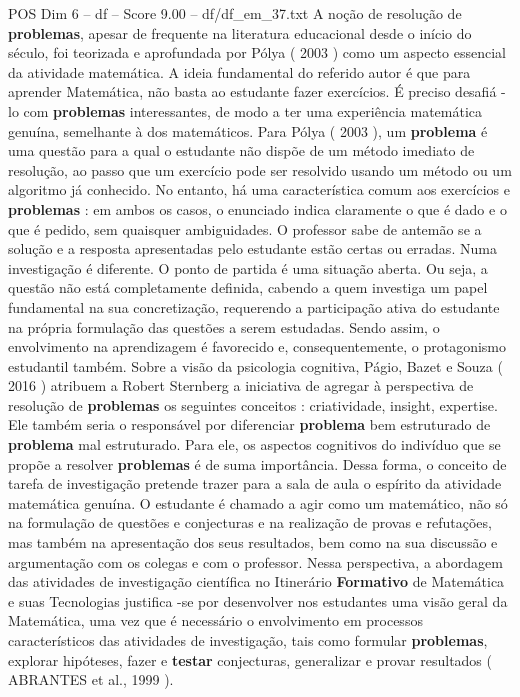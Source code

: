 \begin{textsample}{POS Dim 6 – df – Score 9.00 – df/df\_em\_37.txt}
A noção de resolução de \textbf{problemas}, apesar de frequente na literatura educacional desde o início do século, foi teorizada e aprofundada por Pólya ( 2003 ) como um aspecto essencial da atividade matemática.
A ideia fundamental do referido autor é que para aprender Matemática, não basta ao estudante fazer exercícios.
É preciso desafiá -lo com \textbf{problemas} interessantes, de modo a ter uma experiência matemática genuína, semelhante à dos matemáticos.
Para Pólya ( 2003 ), um \textbf{problema} é uma questão para a qual o estudante não dispõe de um método imediato de resolução, ao passo que um exercício pode ser resolvido usando um método ou um algoritmo já conhecido.
No entanto, há uma característica comum aos exercícios e \textbf{problemas} : em ambos os casos, o enunciado indica claramente o que é dado e o que é pedido, sem quaisquer ambiguidades.
O professor sabe de antemão se a solução e a resposta apresentadas pelo estudante estão certas ou erradas.
Numa investigação é diferente.
O ponto de partida é uma situação aberta.
Ou seja, a questão não está completamente definida, cabendo a quem investiga um papel fundamental na sua concretização, requerendo a participação ativa do estudante na própria formulação das questões a serem estudadas.
Sendo assim, o envolvimento na aprendizagem é favorecido e, consequentemente, o protagonismo estudantil também.
Sobre a visão da psicologia cognitiva, Págio, Bazet e Souza ( 2016 ) atribuem a Robert Sternberg a iniciativa de agregar à perspectiva de resolução de \textbf{problemas} os seguintes conceitos : criatividade, insight, expertise.
Ele também seria o responsável por diferenciar \textbf{problema} bem estruturado de \textbf{problema} mal estruturado.
Para ele, os aspectos cognitivos do indivíduo que se propõe a resolver \textbf{problemas} é de suma importância.
Dessa forma, o conceito de tarefa de investigação pretende trazer para a sala de aula o espírito da atividade matemática genuína.
O estudante é chamado a agir como um matemático, não só na formulação de questões e conjecturas e na realização de provas e refutações, mas também na apresentação dos seus resultados, bem como na sua discussão e argumentação com os colegas e com o professor.
Nessa perspectiva, a abordagem das atividades de investigação científica no Itinerário \textbf{Formativo} de Matemática e suas Tecnologias justifica -se por desenvolver nos estudantes uma visão geral da Matemática, uma vez que é necessário o envolvimento em processos característicos das atividades de investigação, tais como formular \textbf{problemas}, explorar hipóteses, fazer e \textbf{testar} conjecturas, generalizar e provar resultados ( ABRANTES et al., 1999 ).

\end{textsample}
